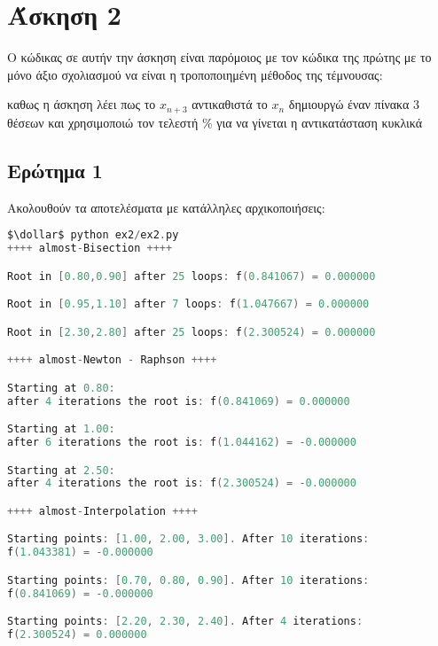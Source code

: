 \section{Άσκηση 2}

Ο κώδικας σε αυτήν την άσκηση είναι παρόμοιος με τον κώδικα της πρώτης
με το μόνο άξιο σχολιασμού να είναι η τροποποιημένη μέθοδος της τέμνουσας:


καθως η άσκηση λέει πως το $x_{n+3}$ αντικαθιστά το $x_n$
δημιουργώ έναν πίνακα 3 θέσεων και χρησιμοποιώ τον τελεστή $\%$
για να γίνεται η αντικατάσταση κυκλικά

\subsection{Ερώτημα 1}

Ακολουθούν τα αποτελέσματα με κατάλληλες αρχικοποιήσεις:
\begin{lstlisting}[language=C, mathescape=true]
$\dollar$ python ex2/ex2.py
++++ almost-Bisection ++++

Root in [0.80,0.90] after 25 loops: f(0.841067) = 0.000000

Root in [0.95,1.10] after 7 loops: f(1.047667) = 0.000000

Root in [2.30,2.80] after 25 loops: f(2.300524) = 0.000000

++++ almost-Newton - Raphson ++++

Starting at 0.80:
after 4 iterations the root is: f(0.841069) = 0.000000

Starting at 1.00:
after 6 iterations the root is: f(1.044162) = -0.000000

Starting at 2.50:
after 4 iterations the root is: f(2.300524) = -0.000000

++++ almost-Interpolation ++++

Starting points: [1.00, 2.00, 3.00]. After 10 iterations:
f(1.043381) = -0.000000

Starting points: [0.70, 0.80, 0.90]. After 10 iterations:
f(0.841069) = -0.000000

Starting points: [2.20, 2.30, 2.40]. After 4 iterations:
f(2.300524) = 0.000000
\end{lstlisting}


